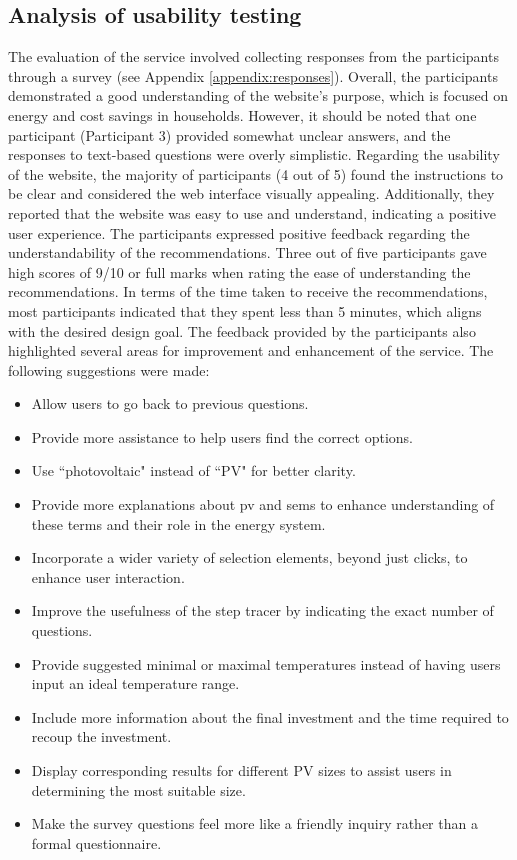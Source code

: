 \subsection{Analysis of usability testing}

The evaluation of the service involved collecting responses from the participants through a survey (see Appendix \ref{appendix:responses}). 
Overall, the participants demonstrated a good understanding of the website's purpose, which is focused on energy and cost savings in households. 
However, it should be noted that one participant (Participant 3) provided somewhat unclear answers, and the responses to text-based questions were overly simplistic.
Regarding the usability of the website, the majority of participants (4 out of 5) found the instructions to be clear and considered the web interface visually appealing. 
Additionally, they reported that the website was easy to use and understand, indicating a positive user experience.
The participants expressed positive feedback regarding the understandability of the recommendations. 
Three out of five participants gave high scores of 9/10 or full marks when rating the ease of understanding the recommendations. 
In terms of the time taken to receive the recommendations, most participants indicated that they spent less than 5 minutes, which aligns with the desired design goal.
The feedback provided by the participants also highlighted several areas for improvement and enhancement of the service. 
The following suggestions were made:

\begin{itemize}
  \item Allow users to go back to previous questions.
  \item Provide more assistance to help users find the correct options.
  \item Use ``photovoltaic" instead of ``PV" for better clarity.
  \item Provide more explanations about \gls{pv} and \gls{sems} to enhance understanding of these terms and their role in the energy system. 
  \item Incorporate a wider variety of selection elements, beyond just clicks, to enhance user interaction.
  \item Improve the usefulness of the step tracer by indicating the exact number of questions.
  \item Provide suggested minimal or maximal temperatures instead of having users input an ideal temperature range.
  \item Include more information about the final investment and the time required to recoup the investment.
  \item Display corresponding results for different PV sizes to assist users in determining the most suitable size.
  \item Make the survey questions feel more like a friendly inquiry rather than a formal questionnaire.
\end{itemize}


